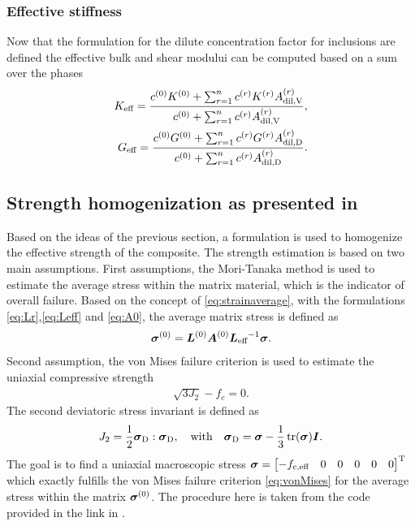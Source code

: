 \subsubsection{Effective stiffness}
Now that the formulation for the dilute concentration factor for inclusions are defined the effective bulk and shear modului can be computed based on a sum over the phases
\begin{align}
K_{\text{eff}} = \dfrac{c^{(0)}K^{(0)} + \sum^{n}_{r=1} c^{(r)} K^{(r)} A^{(r)}_{\text{dil,V}}}{c^{(0)} + \sum^{n}_{r=1} c^{(r)} A^{(r)}_{\text{dil,V}}},\label{eq:keff} \\
G_{\text{eff}} = \dfrac{c^{(0)}G^{(0)} + \sum^{n}_{r=1} c^{(r)} G^{(r)} A^{(r)}_{\text{dil,D}}}{c^{(0)} + \sum^{n}_{r=1} c^{(r)} A^{(r)}_{\text{dil,D}}}.\label{eq:geff}
\end{align}
\subsection{Strength homogenization as presented in \cite{nev_2018_mcam}}
Based on the ideas of the previous section, a formulation is used to homogenize the effective strength of the composite.
The strength estimation is based on two main assumptions.
First assumptions, the Mori-Tanaka method is used to estimate the average stress within the matrix material, which is the indicator of overall failure.
Based on the concept of \eqref{eq:strainaverage}, with the formulations \eqref{eq:Lr},\eqref{eq:Leff} and \eqref{eq:A0}, the average matrix stress is defined as 
\begin{align}
	\boldsymbol{\sigma}^{(0)} = \boldsymbol{L}^{(0)}\boldsymbol{A}^{(0)} {\boldsymbol{L}_{\text{eff}}}^{-1}\boldsymbol{\sigma}. \label{eq:matrixstress}
\end{align}
Second assumption, the von Mises failure criterion is used to estimate the uniaxial compressive strength
\begin{align}
	\sqrt{3 J_2} - {f_c} = 0. \label{eq:vonMises}
\end{align}
The second deviatoric stress invariant is defined as
\begin{align}
	J_2 = \frac{1}{2} \boldsymbol{\sigma}_{\text{D}}:\boldsymbol{\sigma}_{\text{D}},\quad\text{with}\quad
	\boldsymbol{\sigma}_{\text{D}} = \boldsymbol{\sigma} - \frac{1}{3}\operatorname{tr}(\boldsymbol{\sigma})\boldsymbol{I}.
\end{align}
The goal is to find a uniaxial macroscopic stress $\boldsymbol{\sigma} = \begin{bmatrix} -f_{\text{c,eff}} & 0 & 0 &0&0&0 \end{bmatrix}^\text{T}$ which exactly fulfills the von Mises failure criterion \eqref{eq:vonMises} for the average stress within the matrix $\boldsymbol{\sigma}^{(0)}$.
The procedure here is taken from the code provided in the link in \cite{nee_2012_ammf}.

